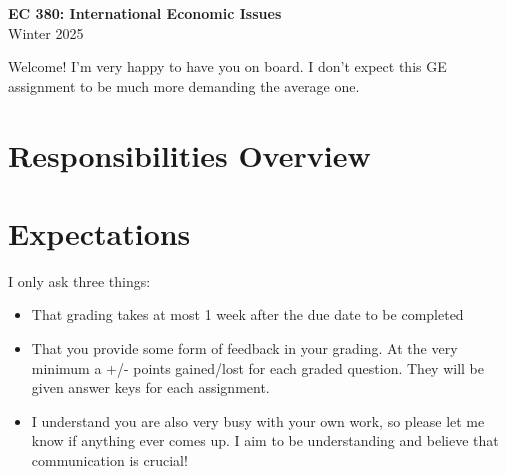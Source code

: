 \documentclass[11pt]{article}
\begin{document}
\selectfont

\begin{center}
  \textbf{\huge EC 380: International Economic Issues}\\ 
  \vspace{0.1in}
  Winter 2025
\end{center}

\bigskip

Welcome!
I'm very happy to have you on board. 
I don't expect this GE assignment to be much more demanding the average one.

\section*{Responsibilities Overview}



\section*{Expectations}
I only ask three things:

\begin{itemize}
  \item That grading takes at most 1 week after the due date to be completed
  \item That you provide some form of feedback in your grading.
  At the very minimum a +/- points gained/lost for each graded question.
  They will be given answer keys for each assignment.
  \item I understand you are also very busy with your own work, so please let me know if anything ever comes up. 
  I aim to be understanding and believe that communication is crucial!
\end{itemize} 


\end{document}
